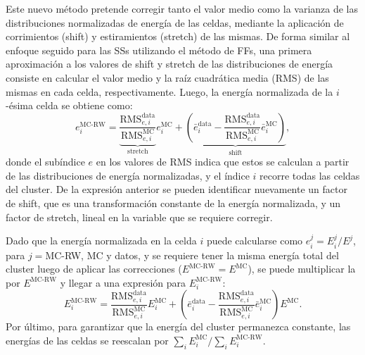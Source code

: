 Este nuevo método pretende corregir tanto el valor medio como la varianza de las distribuciones normalizadas de energía de las celdas, mediante la aplicaci\'on de corrimientos (shift) y estiramientos (stretch) de las mismas. De forma similar al enfoque seguido para las \acp{SS} utilizando el m\'etodo de \acp{FF}, una primera aproximación a los valores de shift y stretch de las distribuciones de energía consiste en calcular el valor medio y la raíz cuadrática media (RMS) de las mismas en cada celda, respectivamente.
Luego, la energía normalizada de la \(i\)-\'esima celda se obtiene como:
\begin{equation}
    \label{eq:ss_corrections:cell_rw:calculation:new:normalized_e}
    e_i^{\text{MC-RW}} =
    \underbrace{\frac{\text{RMS}_{e,i}^{\text{data}}}{\text{RMS}_{e,i}^{\text{MC}}}}_{\text{stretch}} e_i^{\text{MC}}
    +
    \underbrace{\left(\bar e_i^{\text{data}} - \frac{\text{RMS}_{e,i}^{\text{data}}}{\text{RMS}_{e,i}^{\text{MC}}} \bar e_i^{\text{MC}}  \right)}_{\text{shift}},
\end{equation}
donde el subíndice \(e\) en los valores de RMS indica que estos se calculan a partir de las distribuciones de energía normalizadas, y el \'indice \(i\) recorre todas las celdas del cluster. De la expresi\'on anterior se pueden identificar nuevamente un factor de shift, que es una transformaci\'on constante de la energ\'ia normalizada, y un factor de stretch, lineal en la variable que se requiere corregir.

Dado que la energía normalizada en la celda \(i\) puede calcularse como \(e_i^{j} = E_i^{j} / E^{j}\), para \(j=\)MC-RW, MC y datos, y se requiere tener la misma energía total del cluster luego de aplicar las correcciones (\(E^{\text{MC-RW}} = E^{\text{MC}}\)), se puede multiplicar la \Eqn{\ref{eq:ss_corrections:cell_rw:calculation:new:normalized_e}} por \(E^{\text{MC-RW}}\) y llegar a una expresión para \(E_i^{\text{MC-RW}}\):
\begin{equation}
    \label{eq:ss_corrections:cell_rw:calculation:new:correction_method}
    E_i^{\text{MC-RW}} =
    \frac{\text{RMS}_{e,i}^{\text{data}}}{\text{RMS}_{e,i}^{\text{MC}}} E_i^{\text{MC}}
    +
    \left( \bar e_i^{\text{data}} - \frac{\text{RMS}_{e,i}^{\text{data}}}{\text{RMS}_{e,i}^{\text{MC}}} \bar e_i^{\text{MC}} \right) E^{\text{MC}}.
\end{equation}
Por último, para garantizar que la energía del cluster permanezca constante, las energías de las celdas se reescalan por \(\sum_i E_i^{\text{MC}} / \sum_i E_i^{\text{MC-RW}}\).

